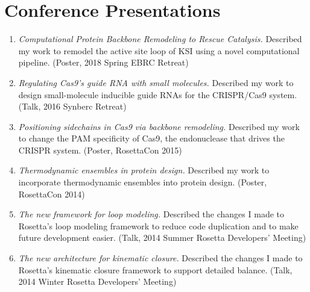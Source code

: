 \section{Conference Presentations}

\begin{enumerate}

\item \emph{Computational Protein Backbone Remodeling to Rescue Catalysis.} 
    Described my work to remodel the active site loop of KSI using a novel 
        computational pipeline. (Poster, 2018 Spring EBRC Retreat)

\item \emph{Regulating Cas9's guide RNA with small molecules.} Described my work 
 to design small-molecule inducible guide RNAs for the CRISPR/Cas9 system.  
  (Talk, 2016 Synberc Retreat)

\item \emph{Positioning sidechains in Cas9 via backbone remodeling.} Described 
 my work to change the PAM specificity of Cas9, the endonuclease that drives 
  the CRISPR system.  (Poster, RosettaCon 2015)

\item \emph{Thermodynamic ensembles in protein design.} Described my work to 
 incorporate thermodynamic ensembles into protein design.  (Poster, RosettaCon 
  2014)

\item \emph{The new framework for loop modeling.} Described the changes I made 
 to Rosetta's loop modeling framework to reduce code duplication and to make 
  future development easier.  (Talk, 2014 Summer Rosetta Developers' Meeting)

\item \emph{The new architecture for kinematic closure.} Described the changes 
 I made to Rosetta's kinematic closure framework to support detailed balance.  
  (Talk, 2014 Winter Rosetta Developers' Meeting)

\end{enumerate}


